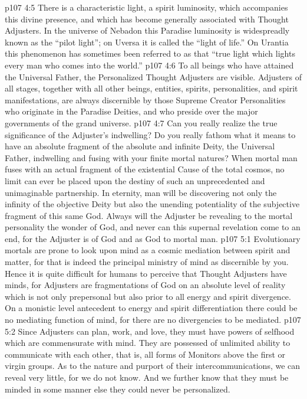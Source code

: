 \vs p107 4:5 There is a characteristic light, a spirit luminosity, which accompanies this divine presence, and which has become generally associated with Thought Adjusters. In the universe of Nebadon this Paradise luminosity is widespreadly known as the “pilot light”; on Uversa it is called the “light of life.” On Urantia this phenomenon has sometimes been referred to as that “true light which lights every man who comes into the world.”
\vs p107 4:6 To all beings who have attained the Universal Father, the Personalized Thought Adjusters are visible. Adjusters of all stages, together with all other beings, entities, spirits, personalities, and spirit manifestations, are always discernible by those Supreme Creator Personalities who originate in the Paradise Deities, and who preside over the major governments of the grand universe.
\vs p107 4:7 \pc Can you really realize the true significance of the Adjuster’s indwelling? Do you really fathom what it means to have an absolute fragment of the absolute and infinite Deity, the Universal Father, indwelling and fusing with your finite mortal natures? When mortal man fuses with an actual fragment of the existential Cause of the total cosmos, no limit can ever be placed upon the destiny of such an unprecedented and unimaginable partnership. In eternity, man will be discovering not only the infinity of the objective Deity but also the unending potentiality of the subjective fragment of this same God. Always will the Adjuster be revealing to the mortal personality the wonder of God, and never can this supernal revelation come to an end, for the Adjuster is of God and as God to mortal man.
\vs p107 5:1 Evolutionary mortals are prone to look upon mind as a cosmic mediation between spirit and matter, for that is indeed the principal ministry of mind as discernible by you. Hence it is quite difficult for humans to perceive that Thought Adjusters have minds, for Adjusters are fragmentations of God on an absolute level of reality which is not only prepersonal but also prior to all energy and spirit divergence. On a monistic level antecedent to energy and spirit differentiation there could be no mediating function of mind, for there are no divergencies to be mediated.
\vs p107 5:2 Since Adjusters can plan, work, and love, they must have powers of selfhood which are commensurate with mind. They are possessed of unlimited ability to communicate with each other, that is, all forms of Monitors above the first or virgin groups. As to the nature and purport of their intercommunications, we can reveal very little, for we do not know. And we further know that they must be minded in some manner else they could never be personalized.
